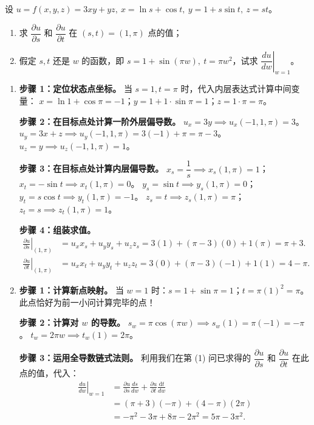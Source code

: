 \documentclass[lang=cn,11pt]{elegantbook}
\begin{document}
\begin{exercise}[点处偏导数与全导数计算]
设 $u = f(x,y,z) = 3xy+yz,\ x = \ln s+\cos t,\ y = 1+s\sin t,\ z = st$。
\begin{enumerate}
  \item[(1)] 求 $\dfrac{\partial u}{\partial s}$ 和 $\dfrac{\partial u}{\partial t}$ 在 $(s,t) = (1,\pi)$ 点的值；
  \item[(2)] 假定 $s,t$ 还是 $w$ 的函数，即 $s = 1+\sin(\pi w),\ t = \pi w^2$，试求 $\left.\dfrac{du}{dw}\right|_{w=1}$。
\end{enumerate}
\end{exercise}

\begin{solution}
\begin{enumerate}
  \item[(1)] \textbf{步骤 1：定位状态点坐标。}
  当 $s=1, t=\pi$ 时，代入内层表达式计算中间变量：
  $x = \ln 1 + \cos\pi = -1$；$y = 1 + 1\cdot\sin\pi = 1$；$z = 1\cdot\pi = \pi$。

  \textbf{步骤 2：在目标点处计算一阶外层偏导数。}
  $u_x = 3y \implies u_x(-1,1,\pi) = 3$。
  $u_y = 3x + z \implies u_y(-1,1,\pi) = 3(-1) + \pi = \pi - 3$。
  $u_z = y \implies u_z(-1,1,\pi) = 1$。

  \textbf{步骤 3：在目标点处计算内层偏导数。}
  $x_s = \dfrac{1}{s} \implies x_s(1,\pi) = 1$； $x_t = -\sin t \implies x_t(1,\pi) = 0$。
  $y_s = \sin t \implies y_s(1,\pi) = 0$； $y_t = s\cos t \implies y_t(1,\pi) = -1$。
  $z_s = t \implies z_s(1,\pi) = \pi$； $z_t = s \implies z_t(1,\pi) = 1$。

  \textbf{步骤 4：组装求值。}
  \begin{align*}
  \left.\frac{\partial u}{\partial s}\right|_{(1,\pi)} &= u_x x_s + u_y y_s + u_z z_s = 3(1) + (\pi-3)(0) + 1(\pi) = \pi + 3. \\
  \left.\frac{\partial u}{\partial t}\right|_{(1,\pi)} &= u_x x_t + u_y y_t + u_z z_t = 3(0) + (\pi-3)(-1) + 1(1) = 4 - \pi.
  \end{align*}

  \item[(2)] \textbf{步骤 1：计算新点映射。}
  当 $w=1$ 时：$s = 1+\sin\pi = 1$；$t = \pi(1)^2 = \pi$。此点恰好为前一小问计算完毕的点！

  \textbf{步骤 2：计算对 $w$ 的导数。}
  $s_w = \pi\cos(\pi w) \implies s_w(1) = \pi(-1) = -\pi$。
  $t_w = 2\pi w \implies t_w(1) = 2\pi$。

  \textbf{步骤 3：运用全导数链式法则。}
  利用我们在第 (1) 问已求得的 $\dfrac{\partial u}{\partial s}$ 和 $\dfrac{\partial u}{\partial t}$ 在此点的值，代入：
  \begin{align*}
  \left.\frac{du}{dw}\right|_{w=1} &= \frac{\partial u}{\partial s} \frac{ds}{dw} + \frac{\partial u}{\partial t} \frac{\mathrm{d}t}{dw} \\
  &= (\pi+3)(-\pi) + (4-\pi)(2\pi) \\
  &= -\pi^2 - 3\pi + 8\pi - 2\pi^2 = 5\pi - 3\pi^2.
  \end{align*}
\end{enumerate}
\end{solution}
\end{document}
